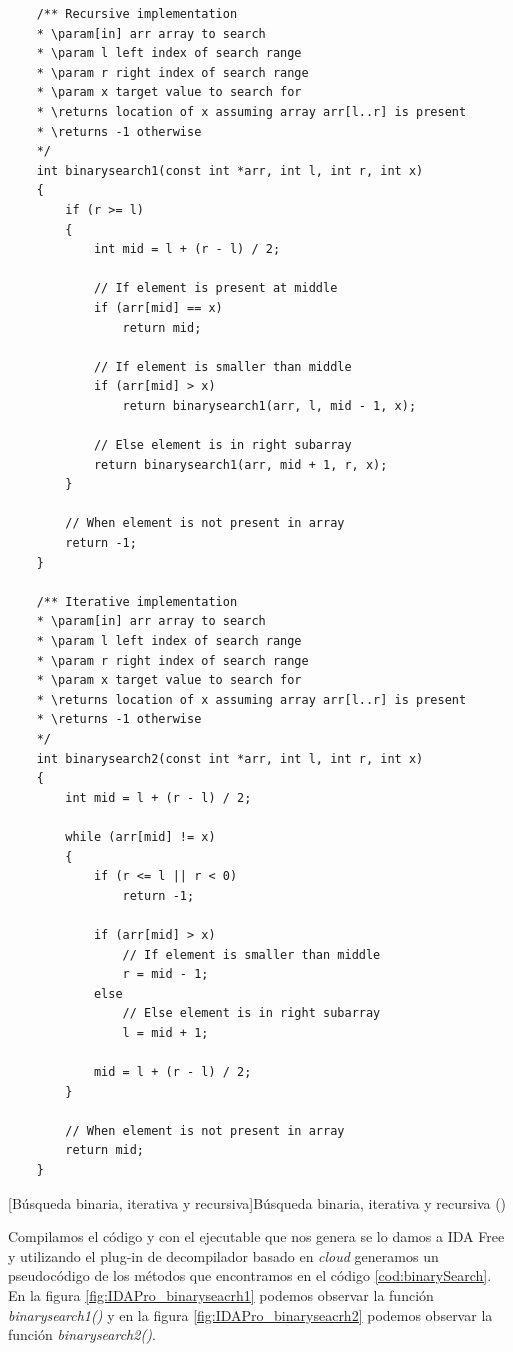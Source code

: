 \begin{mycode}
    \begin{verbatim}
    /** Recursive implementation
    * \param[in] arr array to search
    * \param l left index of search range
    * \param r right index of search range
    * \param x target value to search for
    * \returns location of x assuming array arr[l..r] is present
    * \returns -1 otherwise
    */
    int binarysearch1(const int *arr, int l, int r, int x)
    {
        if (r >= l)
        {
            int mid = l + (r - l) / 2;

            // If element is present at middle
            if (arr[mid] == x)
                return mid;

            // If element is smaller than middle
            if (arr[mid] > x)
                return binarysearch1(arr, l, mid - 1, x);

            // Else element is in right subarray
            return binarysearch1(arr, mid + 1, r, x);
        }

        // When element is not present in array
        return -1;
    }

    /** Iterative implementation
    * \param[in] arr array to search
    * \param l left index of search range
    * \param r right index of search range
    * \param x target value to search for
    * \returns location of x assuming array arr[l..r] is present
    * \returns -1 otherwise
    */
    int binarysearch2(const int *arr, int l, int r, int x)
    {
        int mid = l + (r - l) / 2;

        while (arr[mid] != x)
        {
            if (r <= l || r < 0)
                return -1;

            if (arr[mid] > x)
                // If element is smaller than middle
                r = mid - 1;
            else
                // Else element is in right subarray
                l = mid + 1;

            mid = l + (r - l) / 2;
        }

        // When element is not present in array
        return mid;
    }
    \end{verbatim}
    [Búsqueda binaria, iterativa y recursiva]{Búsqueda binaria, iterativa y recursiva (\cite{BinarySearchGitHub})}
    \label{cod:binarySearch}
\end{mycode}

Compilamos el código y con el ejecutable que nos genera se lo damos a IDA Free y utilizando el plug-in de decompilador basado en \textit{cloud} generamos un pseudocódigo de los métodos
que encontramos en el código \ref{cod:binarySearch}. En la figura \ref{fig:IDAPro_binaryseacrh1} podemos observar la función \textit{binarysearch1()} y en la figura \ref{fig:IDAPro_binaryseacrh2}
podemos observar la función \textit{binarysearch2()}.

